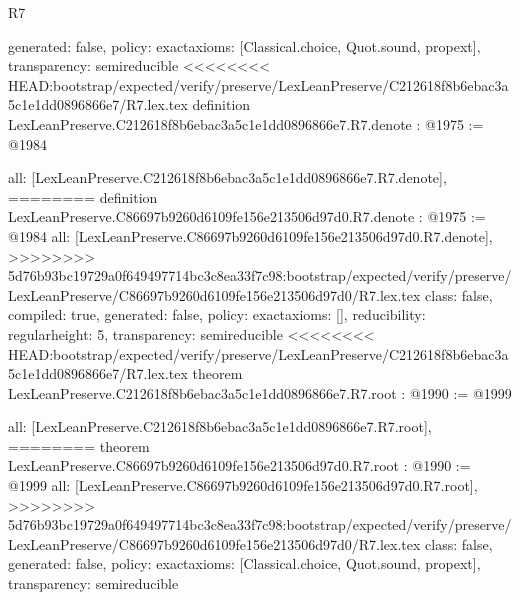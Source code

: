 \begin{lexlean}{R7}
\begin{coremodule}
{{{{{{{{{{{{  generated: false,
  policy: exact{axioms: [Classical.choice, Quot.sound, propext]},
  transparency: semireducible
}
<<<<<<<< HEAD:bootstrap/expected/verify/preserve/LexLeanPreserve/C212618f8b6ebac3a5c1e1dd0896866e7/R7.lex.tex
definition LexLeanPreserve.C212618f8b6ebac3a5c1e1dd0896866e7.R7.denote : @1975 := @1984 {
  all: [LexLeanPreserve.C212618f8b6ebac3a5c1e1dd0896866e7.R7.denote],
========
definition LexLeanPreserve.C86697b9260d6109fe156e213506d97d0.R7.denote : @1975 := @1984 {
  all: [LexLeanPreserve.C86697b9260d6109fe156e213506d97d0.R7.denote],
>>>>>>>> 5d76b93bc19729a0f649497714bc3c8ea33f7c98:bootstrap/expected/verify/preserve/LexLeanPreserve/C86697b9260d6109fe156e213506d97d0/R7.lex.tex
  class: false,
  compiled: true,
  generated: false,
  policy: exact{axioms: []},
  reducibility: regular{height: 5},
  transparency: semireducible
}
<<<<<<<< HEAD:bootstrap/expected/verify/preserve/LexLeanPreserve/C212618f8b6ebac3a5c1e1dd0896866e7/R7.lex.tex
theorem LexLeanPreserve.C212618f8b6ebac3a5c1e1dd0896866e7.R7.root : @1990 := @1999 {
  all: [LexLeanPreserve.C212618f8b6ebac3a5c1e1dd0896866e7.R7.root],
========
theorem LexLeanPreserve.C86697b9260d6109fe156e213506d97d0.R7.root : @1990 := @1999 {
  all: [LexLeanPreserve.C86697b9260d6109fe156e213506d97d0.R7.root],
>>>>>>>> 5d76b93bc19729a0f649497714bc3c8ea33f7c98:bootstrap/expected/verify/preserve/LexLeanPreserve/C86697b9260d6109fe156e213506d97d0/R7.lex.tex
  class: false,
  generated: false,
  policy: exact{axioms: [Classical.choice, Quot.sound, propext]},
  transparency: semireducible
}

}}}}}}}}}}}}}
\end{coremodule}
\end{lexlean}

